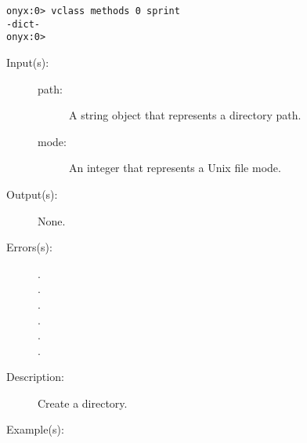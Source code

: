 \begin{description}
\begin{description}
\begin{verbatim}
onyx:0> vclass methods 0 sprint
-dict-
onyx:0>
		\end{verbatim}
	\end{description}
\label{systemdict:mkdir}
\item[{\onyxop{path}{mkdir}{--}}: ]
\item[{\onyxop{path mode}{mkdir}{--}}: ]
	\begin{description}\item[]
	\item[Input(s): ]
		\begin{description}\item[]
		\item[path: ]
			A string object that represents a directory path.
		\item[mode: ]
			An integer that represents a Unix file mode.
		\end{description}
	\item[Output(s): ] None.
	\item[Errors(s): ]
		\begin{description}\item[]
		\item[.]
		\item[.]
		\item[.]
		\item[.]
		\item[.]
		\item[.]
		\end{description}
	\item[Description: ]
		Create a directory.
	\item[Example(s): ]\begin{verbatim}


\end{verbatim}
\end{description}
\end{description}
